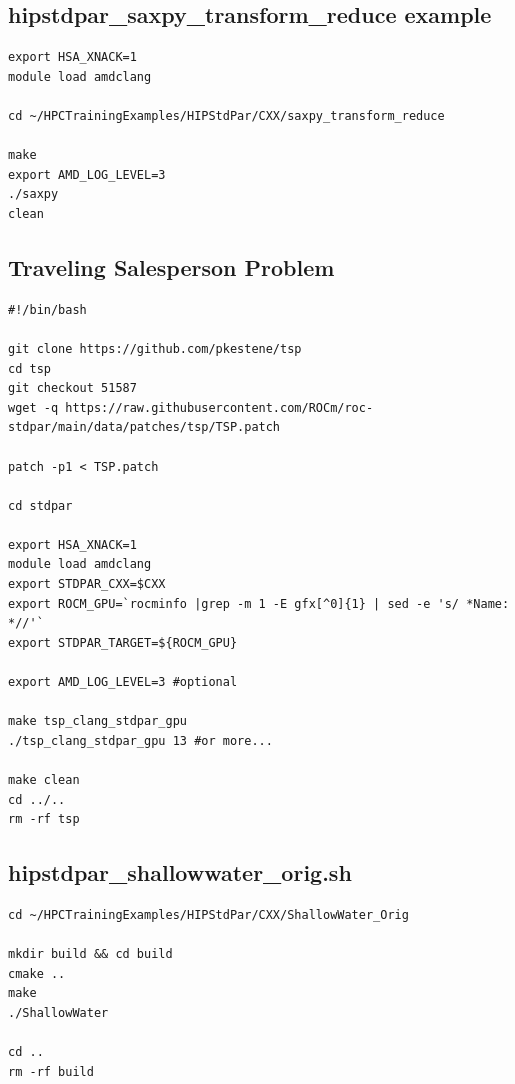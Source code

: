 \documentclass[
]{article}
\begin{document}
\hypertarget{hipstdpar_saxpy_transform_reduce-example}{%
\subsection{hipstdpar\_saxpy\_transform\_reduce
example}\label{hipstdpar_saxpy_transform_reduce-example}}

\begin{verbatim}
export HSA_XNACK=1
module load amdclang

cd ~/HPCTrainingExamples/HIPStdPar/CXX/saxpy_transform_reduce

make
export AMD_LOG_LEVEL=3
./saxpy
clean
\end{verbatim}

\hypertarget{traveling-salesperson-problem}{%
\subsection{Traveling Salesperson
Problem}\label{traveling-salesperson-problem}}

\begin{verbatim}
#!/bin/bash

git clone https://github.com/pkestene/tsp
cd tsp
git checkout 51587
wget -q https://raw.githubusercontent.com/ROCm/roc-stdpar/main/data/patches/tsp/TSP.patch

patch -p1 < TSP.patch

cd stdpar

export HSA_XNACK=1
module load amdclang
export STDPAR_CXX=$CXX
export ROCM_GPU=`rocminfo |grep -m 1 -E gfx[^0]{1} | sed -e 's/ *Name: *//'`
export STDPAR_TARGET=${ROCM_GPU}

export AMD_LOG_LEVEL=3 #optional

make tsp_clang_stdpar_gpu
./tsp_clang_stdpar_gpu 13 #or more...

make clean
cd ../..
rm -rf tsp
\end{verbatim}

\hypertarget{hipstdpar_shallowwater_orig.sh}{%
\subsection{hipstdpar\_shallowwater\_orig.sh}\label{hipstdpar_shallowwater_orig.sh}}

\begin{verbatim}
cd ~/HPCTrainingExamples/HIPStdPar/CXX/ShallowWater_Orig

mkdir build && cd build
cmake ..
make
./ShallowWater

cd ..
rm -rf build
\end{verbatim}
\end{document}
